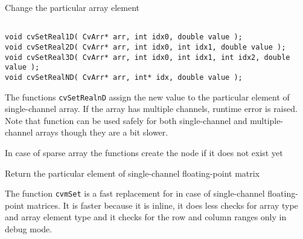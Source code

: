 
Change the particular array element

\begin{lstlisting}

void cvSetReal1D( CvArr* arr, int idx0, double value );
void cvSetReal2D( CvArr* arr, int idx0, int idx1, double value );
void cvSetReal3D( CvArr* arr, int idx0, int idx1, int idx2, double value );
void cvSetRealND( CvArr* arr, int* idx, double value );

\end{lstlisting}

\begin{description}
\end{description}

The functions \texttt{cvSetRealnD} assign the new value to the particular
element of single-channel array. If the array has multiple channels,
runtime error is raised. Note that  function can be used
safely for both single-channel and multiple-channel arrays though they
are a bit slower.

In case of sparse array the functions create the node if it does not exist yet


Return the particular element of single-channel floating-point matrix


\begin{description}
\end{description}


The function \texttt{cvmSet} is a fast replacement for 
in case of single-channel floating-point matrices. It is faster because
it is inline, it does less checks for array type and array element type
and it checks for the row and column ranges only in debug mode.


